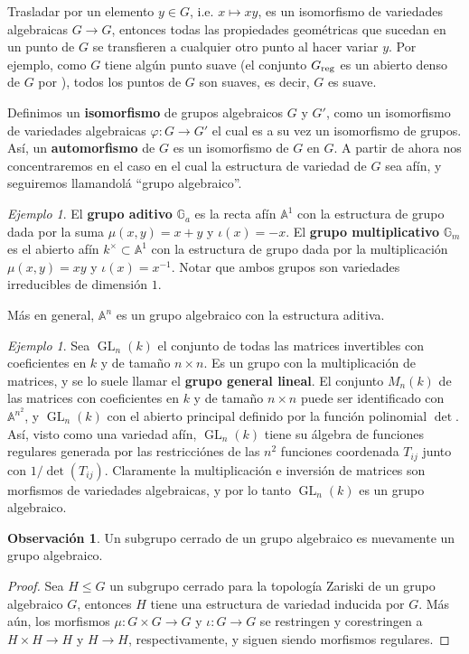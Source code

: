 \documentclass[spanish,10pt]{amsart}
\theoremstyle{definition}
\newtheorem{obs}[theorem]{Observación}
\theoremstyle{remark}
\newtheorem{example}[theorem]{Ejemplo}
\numberwithin{equation}{section}
\newcommand{\afine}[1]{\mathbb{A}^{#1}}
\begin{document}
Trasladar por un elemento $y \in G$, i.e. $x \mapsto x y$, es un isomorfismo de variedades algebraicas $G \to G$, entonces todas las propiedades geométricas que sucedan en un punto de $G$ se transfieren a cualquier otro punto al hacer variar $y$. Por ejemplo, como $G$ tiene algún punto suave (el conjunto $G_{\textup{reg}}$ es un abierto denso de $G$ por \cite[Teorema 2.13.12.]{notas_pedro}), todos los puntos de $G$ son suaves, es decir, $G$ es suave.

Definimos un \textbf{isomorfismo} de grupos algebraicos $G$ y $G'$, como un isomorfismo de variedades algebraicas $\varphi : G \to G'$ el cual es a su vez un isomorfismo de grupos. Así, un \textbf{automorfismo} de $G$ es un isomorfismo de $G$ en $G$. A partir de ahora nos concentraremos en el caso en el cual la estructura de variedad de $G$ sea afín, y seguiremos llamandolá ``grupo algebraico''.

\begin{example}
El \textbf{grupo aditivo} $\mathbb{G}_a$ es la recta afín $\afine 1$ con la estructura de grupo dada por la suma $\mu (x,y) = x + y$ y $\iota (x) = -x$. El \textbf{grupo multiplicativo} $\mathbb{G}_m$ es el abierto afín $k^\times \subset \afine 1$ con la estructura de grupo dada por la multiplicación $\mu (x,y) = xy$ y $\iota (x) = x^{-1}$. Notar que ambos grupos son variedades irreducibles de dimensión $1$.

Más en general, $\afine n$ es un grupo algebraico con la estructura aditiva.
\end{example}

\begin{example}
Sea $\operatorname{GL}_n (k)$ el conjunto de todas las matrices invertibles con coeficientes en $k$ y de tamaño $n \times n$. Es un grupo con la multiplicación de matrices, y se lo suele llamar el \textbf{grupo general lineal}. El conjunto $M_n (k)$ de las matrices con coeficientes en $k$ y de tamaño $n \times n$ puede ser identificado con $\afine {n^2}$, y $\operatorname{GL}_n (k)$ con el abierto principal definido por la función polinomial $\det$. Así, visto como una variedad afín, $\operatorname{GL}_n (k)$ tiene su álgebra de funciones regulares generada por las restricciónes de las $n^2$ funciones coordenada $T_{ij}$ junto con $1 / \det (T_{ij})$. Claramente la multiplicación e inversión de matrices son morfismos de variedades algebraicas, y por lo tanto $\operatorname{GL}_n (k)$ es un grupo algebraico.
\end{example}

\begin{obs}\label{obs:subrupo cerrado de grupo algebraico es algebraico}
Un subgrupo cerrado de un grupo algebraico es nuevamente un grupo algebraico.
\end{obs}
\begin{proof}
Sea $H \leq G$ un subgrupo cerrado para la topología Zariski de un grupo algebraico $G$, entonces $H$ tiene una estructura de variedad inducida por $G$. Más aún, los morfismos $\mu : G \times G \to G$ y $\iota : G \to G$ se restringen y corestringen a $H \times H \to H$ y $H \to H$, respectivamente, y siguen siendo morfismos regulares.
\end{proof}
\end{document}

